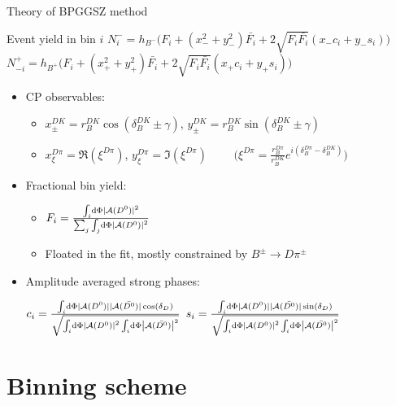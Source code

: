 \documentclass{beamer}
\begin{document}
\begin{frame}{Theory of BPGGSZ method}
  \begin{block}{Event yield in bin $i$}
    \scriptsize
    $N^-_i = h_{B^-}\big(F_i + (x_-^2 + y_-^2)\bar{F_i} + 2\sqrt{F_i\bar{F_i}}(x_-c_i + y_-s_i)\big)$ \\
    $N^+_{-i} = h_{B^+}\big(F_i + (x_+^2 + y_+^2)\bar{F_i} + 2\sqrt{F_i\bar{F_i}}(x_+c_i + y_+s_i)\big)$
  \end{block}
  \begin{itemize}
    \item{CP observables:}
    \begin{itemize}
      \item{$x_\pm^{DK} = r_B^{DK}\cos(\delta_B^{DK}\pm\gamma)$, \quad $y_\pm^{DK} = r_B^{DK}\sin(\delta_B^{DK}\pm\gamma)$}
      \item{$x_\xi^{D\pi} = \Re(\xi^{D\pi})$, $y_\xi^{D\pi} = \Im(\xi^{D\pi})$ $\quad\quad\Big(\xi^{D\pi} = \frac{r_B^{D\pi}}{r_B^{DK}}e^{i(\delta_B^{D\pi} - \delta_B^{DK})}\Big)$}
    \end{itemize}
    \item{Fractional bin yield:}
    \begin{itemize}
      \item{$F_i = \frac{\int_i\dd{\Phi}|\mathcal{A}(D^0)|^2}{\sum_j\int_j\dd{\Phi}\abs{\mathcal{A}(D^0)}^2}$}
      \item{Floated in the fit, mostly constrained by $B^\pm\to D\pi^\pm$}
    \end{itemize}
  \end{itemize}
  \begin{itemize}
    \item{Amplitude averaged strong phases:}
    \begin{center}
      $c_i = \frac{\int_i\dd{\Phi}|\mathcal{A}(D^0)||\mathcal{A}(\bar{D^0})|\cos(\delta_D)}{\sqrt{\int_i\dd{\Phi}\abs{\mathcal{A}(D^0)}^2\int_i\dd{\Phi}\abs{\mathcal{A}(\bar{D^0})}^2}}$ \quad $s_i = \frac{\int_i\dd{\Phi}|\mathcal{A}(D^0)||\mathcal{A}(\bar{D^0})|\sin(\delta_D)}{\sqrt{\int_i\dd{\Phi}\abs{\mathcal{A}(D^0)}^2\int_i\dd{\Phi}\abs{\mathcal{A}(\bar{D^0})}^2}}$
    \end{center}
  \end{itemize}
\end{frame}

\section{Binning scheme}
\end{document}
